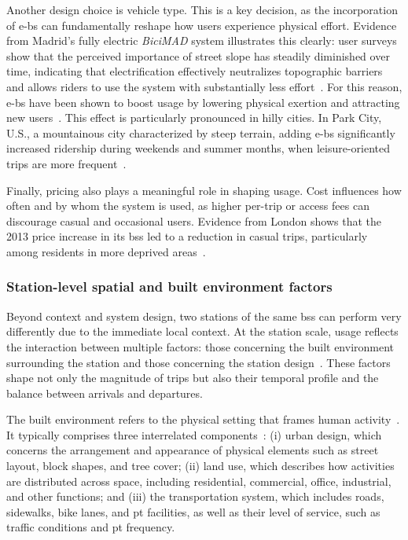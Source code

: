         Another design choice is vehicle type. This is a key decision, as the incorporation of \acp{e-b} can fundamentally reshape how users experience physical effort. Evidence from Madrid’s fully electric \textit{BiciMAD} system illustrates this clearly: user surveys show that the perceived importance of street slope has steadily diminished over time, indicating that electrification effectively neutralizes topographic barriers and allows riders to use the system with substantially less effort~\cite{Julio2022}. For this reason, \acp{e-b} have been shown to boost usage by lowering physical exertion and attracting new users~\cite{Fyhri2015}. This effect is particularly pronounced in hilly cities. In Park City, U.S., a mountainous city characterized by steep terrain, adding \acp{e-b} significantly increased ridership during weekends and summer months, when leisure-oriented trips are more frequent~\cite{He2019}.

        Finally, pricing also plays a meaningful role in shaping usage. Cost influences how often and by whom the system is used, as higher per-trip or access fees can discourage casual and occasional users. Evidence from London shows that the 2013 price increase in its \ac{bss} led to a reduction in casual trips, particularly among residents in more deprived areas~\cite{Goodman2014}.


        \subsubsection{Station-level spatial and built environment factors}

        Beyond context and system design, two stations of the same \ac{bss} can perform very differently due to the immediate local context. At the station scale, usage reflects the interaction between multiple factors: those concerning the built environment surrounding the station and those concerning the station design~\cite{Guo2022, Guo2020, Liu2019, Ma2020_comparison, Chen2021_Identifying}. These factors shape not only the magnitude of trips but also their temporal profile and the balance between arrivals and departures.

        The built environment refers to the physical setting that frames human activity~\cite{Guo2022}. It typically comprises three interrelated components~\cite{Handy2002}: (i) urban design, which concerns the arrangement and appearance of physical elements such as street layout, block shapes, and tree cover; (ii) land use, which describes how activities are distributed across space, including residential, commercial, office, industrial, and other functions; and (iii) the transportation system, which includes roads, sidewalks, bike lanes, and \ac{pt} facilities, as well as their level of service, such as traffic conditions and \ac{pt} frequency.

